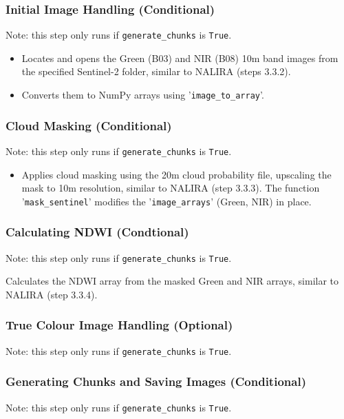 \subsubsection{Initial Image Handling (Conditional)}
Note: this step only runs if \verb|generate_chunks| is \verb|True|.

\begin{itemize}
    \item Locates and opens the Green (B03) and NIR (B08) 10m band images from the specified Sentinel-2 folder, similar to NALIRA (steps 3.3.2).
    \item Converts them to NumPy arrays using '\verb|image_to_array|'.
\end{itemize}

\subsubsection{Cloud Masking (Conditional)}
Note: this step only runs if \verb|generate_chunks| is \verb|True|.

\begin{itemize}
    \item Applies cloud masking using the 20m cloud probability file, upscaling the mask to 10m resolution, similar to NALIRA (step 3.3.3). The function '\verb|mask_sentinel|' modifies the '\verb|image_arrays|' (Green, NIR) in place.
\end{itemize}

\subsubsection{Calculating NDWI (Condtional)}
Note: this step only runs if \verb|generate_chunks| is \verb|True|.

Calculates the NDWI array from the masked Green and NIR arrays, similar to NALIRA (step 3.3.4).

\subsubsection{True Colour Image Handling (Optional)}
Note: this step only runs if \verb|generate_chunks| is \verb|True|. 

\subsubsection{Generating Chunks and Saving Images (Conditional)}
Note: this step only runs if \verb|generate_chunks| is \verb|True|.

